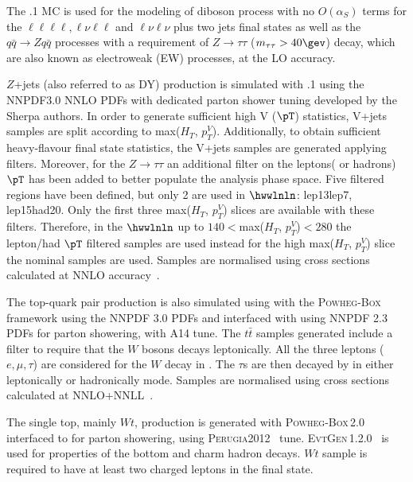 
The .1 MC is used for the modeling of diboson process with no $O(\alpha_S)$ terms for the $\ell\ell\ell\ell, \ell\nu\ell\ell$ and $\ell\nu\ell\nu$ plus two jets final states as well as the $q\bar{q}{\to}Zq\bar{q}$ processes with a requirement of $Z{\to}\tau\tau$ ($m_{\tau\tau} > 40 \gev$) decay,
which are also known as electroweak (EW) processes, at the LO accuracy.

$Z$+jets (also referred to as DY) production is simulated with .1 using the NNPDF3.0 NNLO PDFs with dedicated parton shower tuning developed by the Sherpa authors. 
In order to generate sufficient high V ($\pT$) statistics, V+jets samples are split according to max($H_T$, $p_T^V$). 
Additionally, to obtain sufficient heavy-flavour final state statistics, the V+jets samples are generated applying filters.
Moreover, for the $Z \to \tau \tau$ an additional filter on the leptons( or hadrons) $\pT$ has been added to better populate the analysis phase space.
Five filtered regions have been defined, but only 2 are used in $\hwwlnln$: lep13lep7, lep15had20.
Only the first three max($H_T$, $p_T^V$) slices are available with these filters.
Therefore, in the $\hwwlnln$ up to $140<$max($H_T$, $p_T^V$)$<280$ the lepton/had $\pT$ filtered samples are used instead for the high max($H_T$, $p_T^V$) slice the nominal samples are used.
Samples are normalised using cross sections calculated at NNLO accuracy~\cite{MelnikovPetriello}.

The top-quark pair production is also simulated using \POWHEG with the \textsc{ Powheg-Box} framework using the NNPDF 3.0 PDFs and interfaced with \PythiaEight using NNPDF 2.3 PDFs for parton showering, with A14 tune.
The $t\bar{t}$ samples generated include a filter to require that the $W$ bosons decays leptonically. All the three leptons ($e, \mu, \tau$) are considered for the $W$ decay in \POWHEG. The $\tau$s are then decayed by \PythiaEight in either leptonically or hadronically mode.
Samples are normalised using cross sections calculated at NNLO+NNLL~\cite{Czakon:2013}.

The single top, mainly $Wt$, production is generated with
\textsc{Powheg-Box}\,2.0 interfaced to  for parton showering, using \textsc{Perugia}2012~\cite{Skands:2010ak} tune.
\textsc{ EvtGen}\,1.2.0~\cite{Lange:2001uf} is used for properties of the bottom and charm hadron decays.
$Wt$ sample is required to have at least two charged leptons in the final state.

